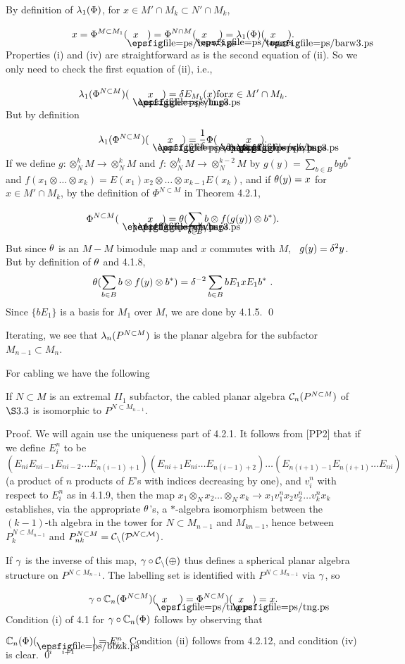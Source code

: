 By definition of $\lambda_1(\Phi)$, for $x\in M'\cap M_k\subset N'\cap
M_k$,
\[
x=\Phi^{M\subset M_1}(\boxe{x})=
\Phi^{N\cap M}(\tangle{x}\ )=
\l_1(\Phi)(\boxe{x}\ ).
\]
Properties (i) and (iv) are straightforward as is the second
equation of (ii). So we only need to check the first equation of
(ii), i.e.,
\[
\l_1(\Phi^{N\subset M})( \vln\ \tanglel{x}\ )=\d E_{M_1}(x) 
\mbox{for}  x\in M'\cap M_k.
\]
But by definition
\[
\l_1(\Phi^{N\subset M})(\vln\ \tanglel{x}\ )
=\frac 1\d \Phi(\vln\  \vln\ \tanglel{x}\ ).
\]
If we define $g:\otimes^k_N M\to \otimes^k_N M$ and
$f:\otimes^k_N M\to\otimes^{k-2}_N M$ by
$g(y)=\sum_{b\in B} byb^*$ and
$f(x_1\otimes\dots\otimes x_k)=E(x_1)x_2\otimes\dots\otimes
x_{k-1} E(x_k)$, and if $\theta(y)=x$ for $x\in M'\cap M_k$, by the
definition of $\Phi^{N\subset M}$ in Theorem 4.2.1,
\[
\Phi^{N\subset M}(\vln\ \vln\  \tanglel{x}\ )=\th
(\sum_{b\in B} b\otimes f(g(y))\otimes b^*).
\]
But since $\theta$
is an $M-M$ bimodule map and $x$ commutes with $M$, \
$g(y)=\delta^2y$. But by definition of $\theta$ and 4.1.8,
\[
\theta(\sum_{b\in B} b\otimes f(y)\otimes b^*)=
\delta^{-2}\sum_{b\in B} bE_1 xE_1b^* \ .
\]
Since $\{bE_1\}$ is a basis for $M_1$ over $M$, we are done by
4.1.5. \qed

\bs Iterating, we see that $\lambda_n(P^{N\subset M})$ is the planar
algebra for the subfactor $M_{n-1}\subset M_n$.

For cabling we have the following

\bigskip
{} If $N\subset M$ is an extremal $II_1$
subfactor, the cabled planar algebra ${\cal C}_n(P^{N\subset M})$ of
$\S3.3$ is isomorphic to $P^{N\subset M_{n-1}}$.

\bigskip
{\sc Proof.} We will again use the uniqueness part of 4.2.1.
It follows from [PP2] that if we define $E^n_i$ to be
$$
(E_{ni}E_{ni-1}E_{ni-2}\dots E_{n(i-1)+1})
(E_{ni+1}E_{ni}\dots E_{n(i-1)+2})\dots
(E_{n(i+1)-1}E_{n(i+1)}\dots E_{ni})
$$
(a product of $n$ products of $E$'s with indices decreasing by
one), and $v^n_i$ with respect to $E^n_i$ as in 4.1.9, then the map
$x_1\otimes_N x_2\dots \otimes_N x_k\to x_1v^n_1 x_2v^n_2\dots
v^n_kx_k$ establishes, via the appropriate $\theta$'s, a $*$-algebra
isomorphism between the $(k-1)$-th algebra in the tower for
$N\subset M_{n-1}$ and $M_{kn-1}$, hence between
$P_k^{N\subset M_{n-1}}$ and $P_{nk}^{N\subset M}=\cal C_n(P^{N\subset M})$.

If $\gamma$ is the inverse of this map, $\gamma\circ\cal C_n(\Phi)$ thus
defines a spherical planar algebra structure on
$P^{N\subset M_{n-1}}$. The labelling set is identified with
$P^{N\subset M_{n-1}}$ via $\gamma$, so
\[
\g\circ\Bbb C_n(\Phi^{N\subset M})(\tangle{x}\ )=
\Phi^{N\subset M})(\tangle{x})=x.
\]
Condition (i) of 4.1 for $\gamma\circ\Bbb C_n(\Phi)$ follows by
observing that\\ 
$\Bbb C_n(\Phi)(\boxj )=E^n_i$.
Condition (ii) follows from 4.2.12, and condition (iv) is clear.
\qed

